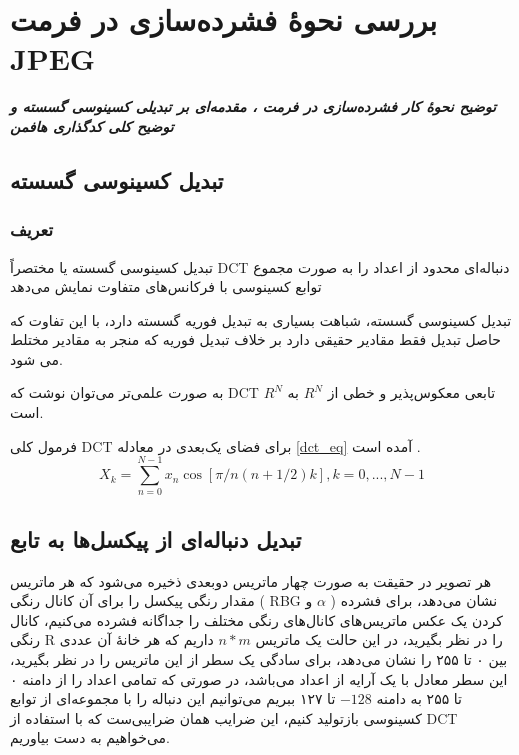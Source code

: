\chapter{بررسی نحوهٔ فشرده‌سازی در فرمت JPEG}
\noindent
\textbf{
	\textit{
        توضیح نحوهٔ کار فشرده‌سازی در فرمت ، 
        مقدمه‌ای بر تبدیلی کسینوسی گسسته و 
        توضیح کلی کدگذاری هافمن
	}
}
\pagebreak

\section{تبدیل کسینوسی گسسته}

\subsection{
تعریف 
}

تبدیل کسینوسی گسسته 
یا مختصراً
 DCT دنباله‌ای محدود از اعداد را به‌ صورت مجموع توابع کسینوسی با فرکانس‌های متفاوت نمایش می‌دهد

 
 تبدیل کسینوسی گسسته، شباهت بسیاری به تبدیل فوریه گسسته دارد، با این تفاوت که حاصل تبدیل فقط مقادیر حقیقی دارد بر خلاف تبدیل فوریه که منجر به مقادیر مختلط می شود.

 به صورت علمی‌تر می‌توان نوشت که 
 DCT 
 تابعی معکوس‌پذیر و خطی از 
 $R^N$ 
 به 
 $R^N$
 است.

 فرمول کلی DCT 
 برای فضای یک‌بعدی در معادله
 \ref{dct_eq} آمده
 است
\cite{dct}.
 \begin{equation}
 X_k = \sum_{n = 0}^{N - 1} x_n \cos [\pi / n  (n + 1/2)k]
 , k = 0, ..., N - 1
 \label{dct_eq}
 \end{equation}

 \section{تبدیل دنباله‌ای از پیکسل‌ها به تابع}
هر تصویر در حقیقت به صورت چهار ماتریس دوبعدی ذخیره می‌شود که هر ماتریس مقدار رنگی پیکسل را برای آن کانال رنگی
(
RBG و $\alpha$
)
نشان می‌دهد، برای فشرده کردن یک عکس ماتریس‌های کانال‌های رنگی مختلف را جداگانه فشرده می‌کنیم، کانال رنگی R 
را در نظر بگیرید، در این حالت یک ماتریس 
$n * m$ 
داریم که هر خانهٔ آن عددی بین ۰ تا ۲۵۵ را نشان می‌دهد، برای سادگی یک سطر از این ماتریس را در نظر بگیرید، این سطر معادل با یک 
آرایه از اعداد می‌باشد، در صورتی که تمامی اعداد را از دامنه ۰ تا ۲۵۵ به دامنه
$ -128 $ تا ۱۲۷ ببریم می‌توانیم این دنباله را با مجموعه‌ای از 
توابع کسینوسی بازتولید کنیم، این ضرایب همان ضرایبی‌ست که با استفاده از DCT 
می‌خواهیم به دست بیاوریم.

